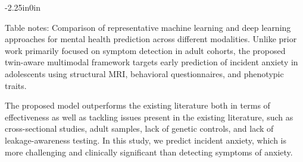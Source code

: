 \documentclass[10pt,letterpaper]{article}
\begin{document}
\begin{table}[!t]
\begin{adjustwidth}{-2.25in}{0in}
                                                                                                                          \begin{flushleft}
                                                                                                                          Table notes: Comparison of representative machine learning and deep learning
                                                                                                                          approaches for mental health prediction across different modalities.
                                                                                                                          Unlike prior work primarily focused on symptom detection in adult cohorts,
                                                                                                                          the proposed twin-aware multimodal framework targets early prediction of
                                                                                                                          incident anxiety in adolescents using structural MRI, behavioral
                                                                                                                          questionnaires, and phenotypic traits.
                                                                                                                          \end{flushleft}

                                                                                                                          \end{adjustwidth}
                                                                                                                          \end{table}

                                                                                                                         The proposed model outperforms the existing literature both in terms of effectiveness as well as tackling issues present in the existing literature, such as cross-sectional studies, adult samples, lack of genetic controls, and lack of leakage-awareness testing. In this study, we predict incident anxiety, which is more challenging and clinically significant than detecting symptoms of anxiety.
\end{document}
